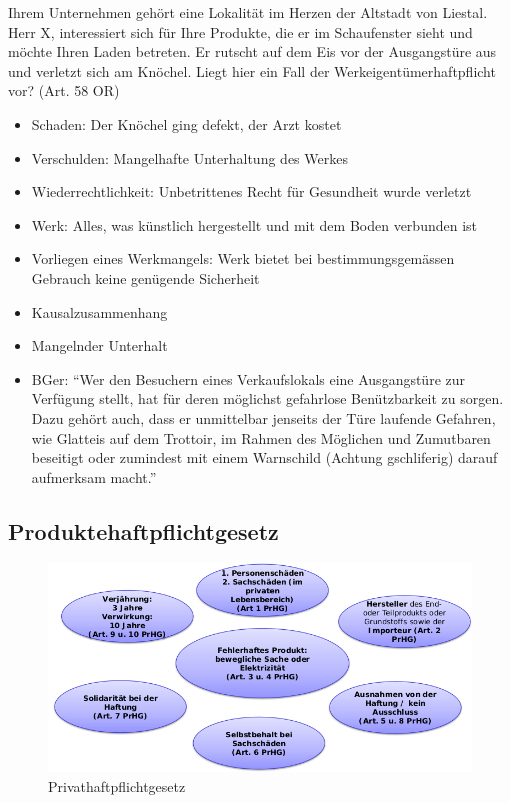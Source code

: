 Ihrem Unternehmen gehört eine Lokalität im Herzen der Altstadt von
Liestal. Herr X, interessiert sich für Ihre Produkte, die er im
Schaufenster sieht und möchte Ihren Laden betreten. Er rutscht auf dem
Eis vor der Ausgangstüre aus und verletzt sich am Knöchel. Liegt hier
ein Fall der Werkeigentümerhaftpflicht vor? (Art. 58 OR)

\begin{itemize}
	\tightlist
	\item Schaden: Der Knöchel ging defekt, der Arzt kostet
	\item Verschulden: Mangelhafte Unterhaltung des Werkes
	\item Wiederrechtlichkeit: Unbetrittenes Recht für Gesundheit wurde
	verletzt
	\item Werk: Alles, was künstlich hergestellt und mit dem Boden verbunden ist
	\item Vorliegen eines Werkmangels: Werk bietet bei bestimmungsgemässen
	Gebrauch keine genügende Sicherheit
	\item Kausalzusammenhang
	\item Mangelnder Unterhalt
	\item BGer: ``Wer den Besuchern eines Verkaufslokals eine Ausgangstüre zur
	Verfügung stellt, hat für deren möglichst gefahrlose Benützbarkeit zu
	sorgen. Dazu gehört auch, dass er unmittelbar jenseits der Türe
	laufende Gefahren, wie Glatteis auf dem Trottoir, im Rahmen des
	Möglichen und Zumutbaren beseitigt oder zumindest mit einem Warnschild
	(Achtung gschliferig) darauf aufmerksam macht.''
\end{itemize}

\subsection{Produktehaftpflichtgesetz}

\begin{figure}[H]
	\centering
	\includegraphics[width=.8\textwidth]{figures/produkthaftpflicht.png}
	\caption{Privathaftpflichtgesetz}
\end{figure}

